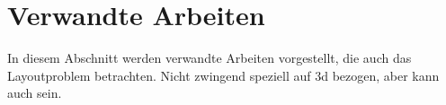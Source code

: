 \section{Verwandte Arbeiten} \label{sec:VerwandteArbeiten}
In diesem Abschnitt werden verwandte Arbeiten vorgestellt, die auch das Layoutproblem betrachten. Nicht zwingend speziell auf 3d bezogen, aber kann auch sein.


